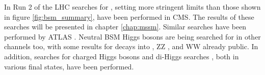 In Run 2 of the \acs{LHC} searches for \AHtotautau, setting more stringent limits than those shown in figure \ref{fig:bsm_summary},
have been performed in \acs{CMS}. The results of these searches will be presented in chapter \ref{chap:mssm}. 
Similar searches have been performed by ATLAS \cite{ATLASMSSMtautau2016}. Neutral BSM Higgs bosons
are being searched for in other channels too, with some results for decays into \ttbar \cite{ATLASHttbar}, 
ZZ \cite{CMSHZZ2016,ATLASHZZ2016}, and WW \cite{ATLASHeavyHWW} already public.
In addition, searches for charged
Higgs bosons \cite{ATLASHplustaunu,ATLASHplustb,CMSHplustaunu} and
di-Higgs searches \cite{ATLASHbbgamgam,ATLASHgamgamWW,ATLASHhhbbbb,CMSbbgamgam,CMSHbbtautau,CMSHbbWW}, both in 
various final states, have been performed. %

